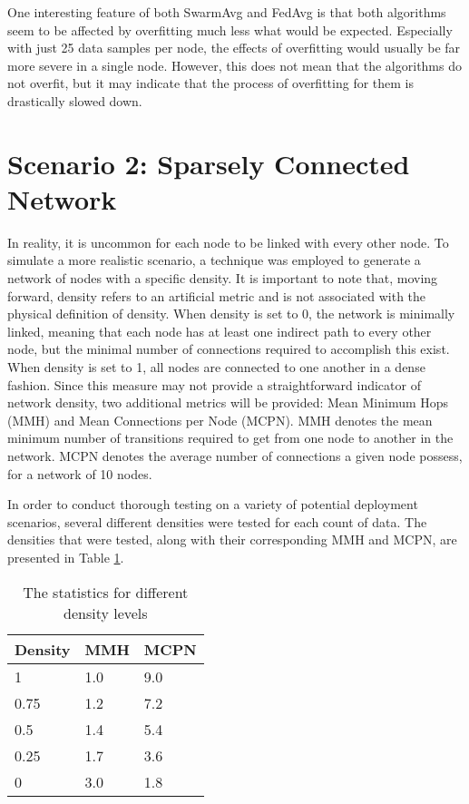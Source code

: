 One interesting feature of both SwarmAvg and FedAvg is that both algorithms seem to be affected by overfitting much less what would be expected. Especially with just 25 data samples per node, the effects of overfitting would usually be far more severe in a single node. However, this does not mean that the algorithms do not overfit, but it may indicate that the process of overfitting for them is drastically slowed down.

\section{Scenario 2: Sparsely Connected Network}
In reality, it is uncommon for each node to be linked with every other node. To simulate a more realistic scenario, a technique was employed to generate a network of nodes with a specific density. It is important to note that, moving forward, density refers to an artificial metric and is not associated with the physical definition of density. When density is set to 0, the network is minimally linked, meaning that each node has at least one indirect path to every other node, but the minimal number of connections required to accomplish this exist. When density is set to 1, all nodes are connected to one another in a dense fashion. Since this measure may not provide a straightforward indicator of network density, two additional metrics will be provided:  Mean Minimum Hops (MMH) and Mean Connections per Node (MCPN). MMH denotes the mean minimum number of transitions required to get from one node to another in the network. MCPN denotes the average number of connections a given node possess, for a network of 10 nodes.

In order to conduct thorough testing on a variety of potential deployment scenarios, several different densities were tested for each count of data. The densities that were tested, along with their corresponding MMH and MCPN, are presented in Table \ref{sparsedensities}.

\begin{table}[H]
	\centering
	\begin{tabular}{l|l|l}
		Density & MMH & MCPN \\ \hline
		1 & 1.0 & 9.0 \\
		0.75    & 1.2 & 7.2  \\
		0.5    & 1.4 & 5.4  \\
		0.25    & 1.7 & 3.6  \\
		0    & 3.0 & 1.8  \\
	\end{tabular}
	\caption{The statistics for different density levels} \label{sparsedensities}
\end{table}

